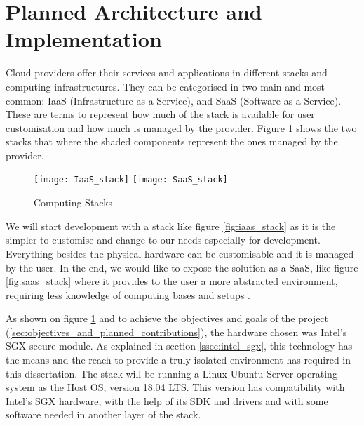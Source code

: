 \section{Planned Architecture and Implementation} %
\label{sec:planned_architecture_and_implementation}

Cloud providers offer their services and applications in different stacks and computing infrastructures. They can be categorised in two main and most common: \gls{IaaS} (Infrastructure as a Service), and \gls{SaaS} (Software as a Service). These are terms to represent how much of the stack is available for user customisation and how much is managed by the provider. Figure \ref{fig:computing_stacks} shows the two stacks that where the shaded components represent the ones managed by the provider.

\begin{figure}[htbp]
  \centering
    {\texttt{[image: IaaS\_stack]}}%
    \hspace{5em}
    {\texttt{[image: SaaS\_stack]}}%
  \caption{Computing Stacks}
  \label{fig:computing_stacks}
\end{figure}

We will start development with a stack like figure \ref{fig:iaas_stack} as it is the simpler to customise and change to our needs especially for development. Everything besides the physical hardware can be customisable and it is managed by the user. In the end, we would like to expose the solution as a \gls{SaaS}, like figure \ref{fig:saas_stack} where it provides to the user a more abstracted environment, requiring less knowledge of computing bases and setups \cite{computing_stacks:1}.

As shown on figure \ref{fig:computing_stacks} and to achieve the objectives and goals of the project (\ref{sec:objectives_and_planned_contributions}), the hardware chosen was Intel's \gls{SGX} secure module. As explained in section \ref{ssec:intel_sgx}, this technology has the means and the reach to provide a truly isolated environment has required in this dissertation. The stack will be running a Linux Ubuntu Server \cite{ubuntu_server:1} operating system as the Host \gls{OS}, version 18.04 LTS. This version has compatibility with Intel's \gls{SGX} hardware, with the help of its \gls{SDK} and drivers \cite{sgx_sdk:1, sgx_drivers:1} and with some software needed in another layer of the stack.

